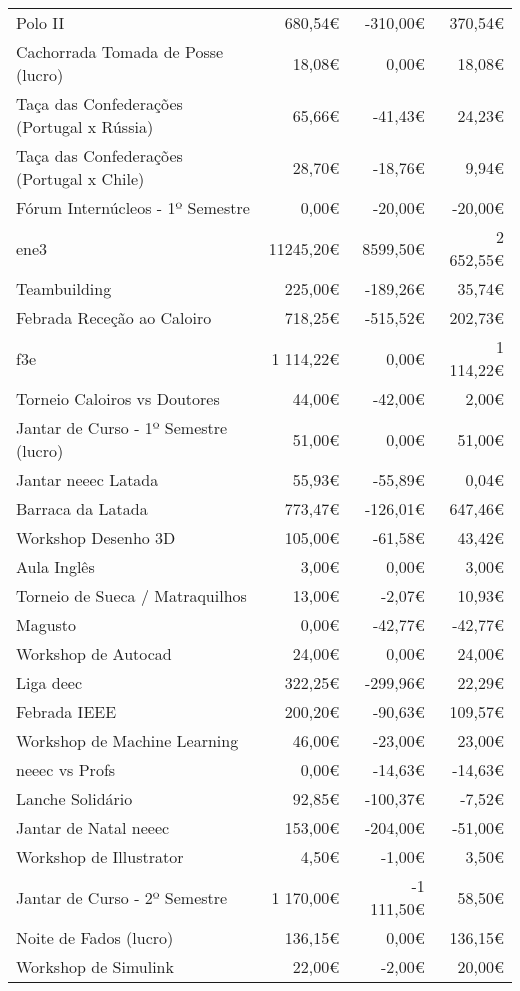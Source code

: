 \begin{longtable}{Xrrr}
Polo II & 680,54€ & -310,00€ & 370,54€ \\
Cachorrada Tomada de Posse (lucro) & 18,08€ & 0,00€ & 18,08€ \\
Taça das Confederações (Portugal x Rússia) & 65,66€ & -41,43€ & 24,23€ \\
Taça das Confederações (Portugal x Chile) & 28,70€ & -18,76€ & 9,94€ \\
Fórum Internúcleos - 1º Semestre & 0,00€ & -20,00€ & -20,00€ \\
\acrshort{ene3} & 11245,20€ & 8599,50€ & 2 652,55€ \\
Teambuilding & 225,00€ & -189,26€ & 35,74€ \\
Febrada Receção ao Caloiro & 718,25€ & -515,52€ & 202,73€ \\
\acrshort{f3e} & 1 114,22€ & 0,00€ & 1 114,22€ \\
Torneio Caloiros vs Doutores & 44,00€ & -42,00€ & 2,00€ \\
Jantar de Curso - 1º Semestre (lucro) & 51,00€ & 0,00€ & 51,00€ \\
Jantar \acrshort{neeec} Latada & 55,93€ & -55,89€ & 0,04€ \\
Barraca da Latada & 773,47€ & -126,01€ & 647,46€ \\
Workshop Desenho 3D & 105,00€ & -61,58€ & 43,42€ \\
Aula Inglês & 3,00€ & 0,00€ & 3,00€ \\
Torneio de Sueca / Matraquilhos & 13,00€ & -2,07€ & 10,93€ \\
Magusto & 0,00€ & -42,77€ & -42,77€ \\
Workshop de Autocad & 24,00€ & 0,00€ & 24,00€ \\
Liga \acrshort{deec} & 322,25€ & -299,96€ & 22,29€ \\
Febrada IEEE & 200,20€ & -90,63€ & 109,57€ \\
Workshop de Machine Learning & 46,00€ & -23,00€ & 23,00€ \\
\acrshort{neeec} vs Profs & 0,00€ & -14,63€ & -14,63€ \\
Lanche Solidário & 92,85€ & -100,37€ & -7,52€ \\
Jantar de Natal \acrshort{neeec} & 153,00€ & -204,00€ & -51,00€ \\
Workshop de Illustrator & 4,50€ & -1,00€ & 3,50€ \\
Jantar de Curso - 2º Semestre & 1 170,00€ & -1 111,50€ & 58,50€ \\
Noite de Fados (lucro) & 136,15€ & 0,00€ & 136,15€ \\
Workshop de Simulink & 22,00€ & -2,00€ & 20,00€ \\

\end{longtable}

